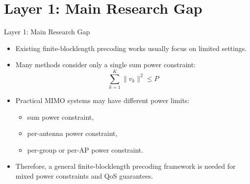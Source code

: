 \documentclass{beamer}
\begin{document}
\section{Layer 1: Main Research Gap}
\begin{frame}{Layer 1: Main Research Gap}
\small

\begin{itemize}
    \item Existing finite-blocklength precoding works usually focus on limited settings.

    \item Many methods consider only a single sum power constraint:
    \[
        \sum_{k=1}^{K}\|v_k\|^2 \le P
    \]

    \item Practical MIMO systems may have different power limits:
    \begin{itemize}
        \item sum power constraint,
        \item per-antenna power constraint,
        \item per-group or per-AP power constraint.
    \end{itemize}

    \item Therefore, a general finite-blocklength precoding framework is needed for mixed power constraints and QoS guarantees.
\end{itemize}

\end{frame}
\end{document}

